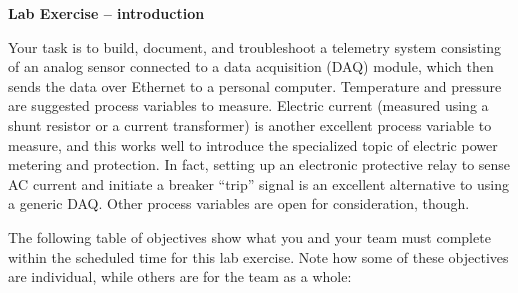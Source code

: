

\noindent
{\bf Lab Exercise -- introduction}

\vskip 5pt

Your task is to build, document, and troubleshoot a telemetry system consisting of an analog sensor connected to a data acquisition (DAQ) module, which then sends the data over Ethernet to a personal computer.  Temperature and pressure are suggested process variables to measure.  Electric current (measured using a shunt resistor or a current transformer) is another excellent process variable to measure, and this works well to introduce the specialized topic of electric power metering and protection.  In fact, setting up an electronic protective relay to sense AC current and initiate a breaker ``trip'' signal is an excellent alternative to using a generic DAQ.  Other process variables are open for consideration, though.

The following table of objectives show what you and your team must complete within the scheduled time for this lab exercise.  Note how some of these objectives are individual, while others are for the team as a whole:




